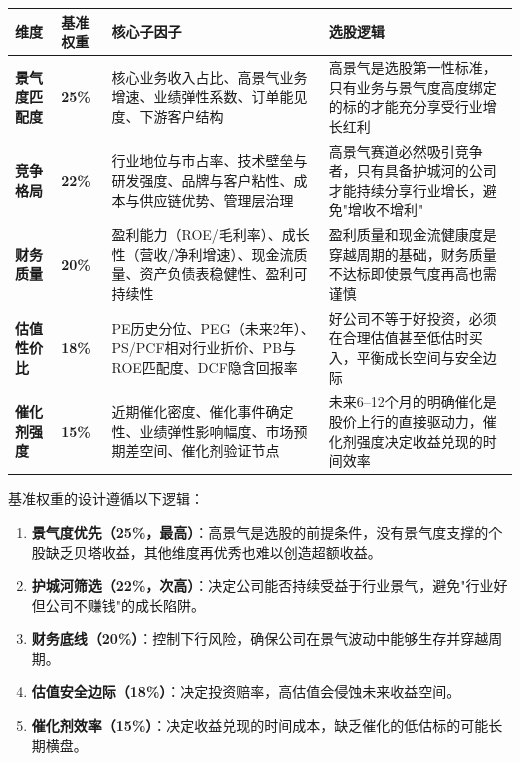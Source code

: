 \begin{exhibitbox}
\centering
\small
\setlength{\tabcolsep}{4pt}
\begin{tabularx}{\linewidth}{L{2.2cm} C{1.0cm} L{3.2cm} X}
\toprule
\textbf{维度} & \textbf{基准权重} & \textbf{核心子因子} & \textbf{选股逻辑} \\
\midrule
{}
\textbf{景气度匹配度} & \textbf{25\%} & 核心业务收入占比、高景气业务增速、业绩弹性系数、订单能见度、下游客户结构 & 高景气是选股第一性标准，只有业务与景气度高度绑定的标的才能充分享受行业增长红利 \\
\hline
{}
\textbf{竞争格局} & \textbf{22\%} & 行业地位与市占率、技术壁垒与研发强度、品牌与客户粘性、成本与供应链优势、管理层治理 & 高景气赛道必然吸引竞争者，只有具备护城河的公司才能持续分享行业增长，避免"增收不增利" \\
\hline
{}
\textbf{财务质量} & \textbf{20\%} & 盈利能力（ROE/毛利率）、成长性（营收/净利增速）、现金流质量、资产负债表稳健性、盈利可持续性 & 盈利质量和现金流健康度是穿越周期的基础，财务质量不达标即使景气度再高也需谨慎 \\
\hline
{}
\textbf{估值性价比} & \textbf{18\%} & PE历史分位、PEG（未来2年）、PS/PCF相对行业折价、PB与ROE匹配度、DCF隐含回报率 & 好公司不等于好投资，必须在合理估值甚至低估时买入，平衡成长空间与安全边际 \\
\hline
{}
\textbf{催化剂强度} & \textbf{15\%} & 近期催化密度、催化事件确定性、业绩弹性影响幅度、市场预期差空间、催化剂验证节点 & 未来6--12个月的明确催化是股价上行的直接驱动力，催化剂强度决定收益兑现的时间效率 \\
\bottomrule
\end{tabularx}
\end{exhibitbox}

基准权重的设计遵循以下逻辑：

\vspace{0.2em}
\begin{enumerate}[leftmargin=2em]
\item \textbf{景气度优先（25\%，最高）}：高景气是选股的前提条件，没有景气度支撑的个股缺乏贝塔收益，其他维度再优秀也难以创造超额收益。
\item \textbf{护城河筛选（22\%，次高）}：决定公司能否持续受益于行业景气，避免"行业好但公司不赚钱"的成长陷阱。
\item \textbf{财务底线（20\%）}：控制下行风险，确保公司在景气波动中能够生存并穿越周期。
\item \textbf{估值安全边际（18\%）}：决定投资赔率，高估值会侵蚀未来收益空间。
\item \textbf{催化剂效率（15\%）}：决定收益兑现的时间成本，缺乏催化的低估标的可能长期横盘。
\end{enumerate}

